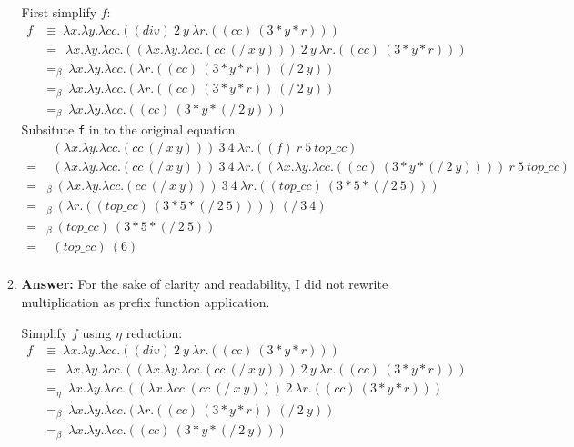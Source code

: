 \documentclass{article}
\begin{document}
\begin{enumerate}
\begin{enumerate}
				First simplify $f$:
			\begin{align*}
			f &\equiv\  \lambda x.\lambda y. \lambda cc.((div)\ 2\ y\ \lambda r.((cc)\
			(3*y*r)))\\
			&=\ \ \lambda x.\lambda y. \lambda cc.((\lambda x.\lambda y. 
			\lambda cc.(cc\ (/\ x\ y)))\ 2\ y\ \lambda r.((cc)\ (3*y*r)))\\
			&=_{\beta}\ \lambda x.\lambda y. \lambda cc.(\lambda r.((cc)\ (3*y*r))\ (/\ 2\ y))\\
			&=_{\beta}\ \lambda x.\lambda y. \lambda cc.(\lambda r.((cc)\ (3*y*r))\ (/\ 2\ y))\\
			&=_{\beta}\ \lambda x.\lambda y. \lambda cc.((cc)\ (3*y*(/\ 2\ y)))
			\end{align*}
			Subsitute \texttt{f} in to the original equation.
			\begin{align*}
			&\ \ (\lambda x.\lambda y. \lambda cc.(cc\ (/\ x\ y)))\ 3\ 4\ \lambda r.((f)\
			r\ 5\ top\_cc)\\
			=&\ \ (\lambda x.\lambda y. \lambda cc.(cc\ (/\ x\ y)))\ 3\ 4\ \lambda
			r.((\lambda x.\lambda y. \lambda cc.((cc)\ (3*y*(/\ 2\ y))))\ r\ 5\ top\_cc)\\
			=&_{\beta}\ (\lambda x.\lambda y. \lambda cc.(cc\ (/\ x\ y)))\ 3\ 4\ \lambda
			r.((top\_cc)\ (3*5*(/\ 2\ 5)))\\
			=&_{\beta}\ (\lambda r.((top\_cc)\ (3*5*(/\ 2\ 5))))\ (/\ 3\ 4)\\
			=&_{\beta}\ (top\_cc)\ (3*5*(/\ 2\ 5))\\
			=&\ \ (top\_cc)\ (6)\\
			\end{align*}

			\item \textbf{Answer:} For the sake of clarity and readability, I did not
				rewrite multiplication as prefix function application.

				Simplify $f$ using $\eta$ reduction:
			\begin{align*}
			f &\equiv\  \lambda x.\lambda y. \lambda cc.((div)\ 2\ y\ \lambda r.((cc)\
			(3*y*r)))\\
			&=\ \ \lambda x.\lambda y. \lambda cc.((\lambda x.\lambda y. 
			\lambda cc.(cc\ (/\ x\ y)))\ 2\ y\ \lambda r.((cc)\ (3*y*r)))\\
			&=_{\eta}\ \lambda x.\lambda y. \lambda cc.((\lambda x. \lambda cc.(cc\
			(/\ x\ y)))\ 2\ \lambda r.((cc)\ (3*y*r)))\\
			&=_{\beta}\ \lambda x.\lambda y. \lambda cc.(\lambda r.((cc)\ (3*y*r))\
			(/\ 2\ y))\\
			&=_{\beta}\ \lambda x.\lambda y. \lambda cc.((cc)\ (3*y*(/\ 2\ y)))
			\end{align*}


\end{enumerate}
\end{enumerate}
\end{document}
